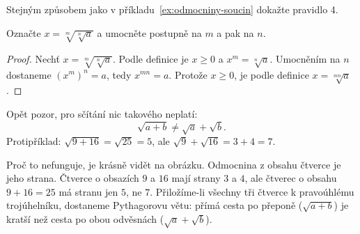 \begin{problem}
  Stejným způsobem jako v příkladu~\ref{ex:odmocniny-soucin} dokažte pravidlo 4.
\end{problem}

\begin{hint}
  Označte $x = \sqrt[m]{\sqrt[n]{a}}$ a umocněte postupně na $m$ a pak na $n$.
\end{hint}

\begin{solution}
  \begin{proof}
    Nechť $x = \sqrt[m]{\sqrt[n]{a}}$. Podle definice je $x\geq 0$ a $x^m = \sqrt[n]{a}$. Umocněním na $n$ dostaneme ${(x^m)}^n = a$, tedy $x^{mn} = a$. Protože $x \geq 0$, je podle definice $x = \sqrt[mn]{a}$.
  \end{proof}
\end{solution}

\begin{definitionbox}
  Opět pozor, pro sčítání nic takového neplatí:
  \begin{equation*}
    \sqrt{a + b} \neq \sqrt{a} + \sqrt{b}.
  \end{equation*}
  Protipříklad: $\sqrt{9 + 16} = \sqrt{25} = 5$, ale $\sqrt{9} + \sqrt{16} = 3 + 4 = 7$.
\end{definitionbox}

Proč to nefunguje, je krásně vidět na obrázku. Odmocnina z obsahu čtverce je jeho strana. Čtverce o obsazích $9$ a $16$ mají strany $3$ a $4$, ale čtverec o obsahu $9 + 16 = 25$ má stranu jen $5$, ne $7$. Přiložíme-li všechny tři čtverce k pravoúhlému trojúhelníku, dostaneme Pythagorovu větu: přímá cesta po přeponě ($\sqrt{a + b}$) je kratší než cesta po obou odvěsnách ($\sqrt{a} + \sqrt{b}$).
\begin{center}
\end{center}

